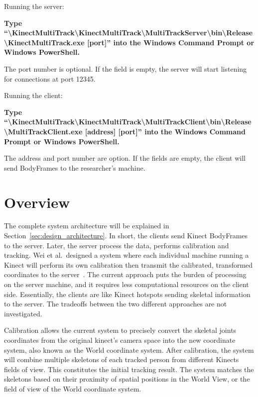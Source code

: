 Running the server:

\textbf{Type ``\textbackslash{KinectMultiTrack}\textbackslash{KinectMultiTrack}\textbackslash{MultiTrackServer}\textbackslash{bin}\textbackslash{Release}\textbackslash{KinectMultiTrack}.exe [port]'' into the Windows Command Prompt or Windows PowerShell.}

The port number is optional. If the field is empty, the server will start listening for connections at port 12345.

Running the client:

\textbf{Type ``\textbackslash{KinectMultiTrack}\textbackslash{KinectMultiTrack}\textbackslash{MultiTrackClient}\textbackslash{bin}\textbackslash{Release}\textbackslash{MultiTrackClient}.exe [address] [port]''  into the Windows Command Prompt or Windows PowerShell.}

The address and port number are option. If the fields are empty, the client will send BodyFrames to the researcher's machine.

\section{Overview}
\label{sec:current_approach_overview}

The complete system architecture will be explained in Section~\ref{sec:design_architecture}. In short, the clients send Kinect BodyFrames to the server. Later, the server process the data, performs calibration and tracking. Wei et al.\ designed a system where each individual machine running a Kinect will perform its own calibration then transmit the calibrated, transformed coordinates to the server~\cite{wei_kinect_calibration}. The current approach puts the burden of processing on the server machine, and it requires less computational resources on the client side. Essentially, the clients are like Kinect hotspots sending skeletal information to the server. The tradeoffs between the two different approaches are not investigated.

Calibration allows the current system to precisely convert the skeletal joints coordinates from the original kinect's camera space into the new coordinate system, also known as the World coordinate system. After calibration, the system will combine multiple skeletons of each tracked person from different Kinects fields of view. This constitutes the initial tracking result. The system matches the skeletons based on their proximity of spatial positions in the World View, or the field of view of the World coordinate system.

